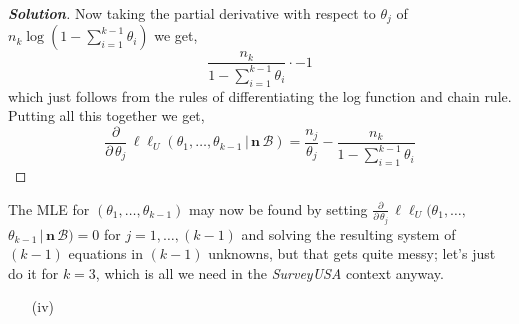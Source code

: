 \documentclass[12pt]{article}
\newcommand{\given}{\, | \,}
\newenvironment{solution}{\begin{tcolorbox}[breakable]\begin{proof}[\textbf{\textit{Solution}}] }{\end{proof}\end{tcolorbox}}
\begin{document}
\begin{itemize}
\begin{itemize}
\begin{itemize}
\begin{solution}
    Now taking the partial derivative with respect to $\theta_j$ of $n_k \log(1 - \sum_{i=1}^{k-1}\theta_i)$ we get,
    \[\dfrac{n_k}{1 - \sum_{i =1 }^{k-1}\theta_i} \cdot -1\] which just follows from the rules of differentiating the log function and chain rule. Putting all this together we get,
    \[\frac{ \partial }{ \partial \, \theta_j } \, \ell \ell_U ( \theta_1, \dots, \theta_{ k - 1 } \given \bm{ n } \, \mathcal{ B } ) = \frac{ n_j }{ \theta_j } - \frac{ n_k }{ 1 - \sum_{ i = 1 }^{ k - 1 } \theta_i }\]
\end{solution}

\vspace*{0.1in}

\end{itemize}

The MLE for $( \theta_1, \dots, \theta_{ k - 1 } )$ may now be found by setting $\frac{ \partial }{ \partial \, \theta_j } \, \ell \ell_U ( \theta_1, \dots,$ $\theta_{ k - 1 } \given \bm{ n } \, \mathcal{ B } ) = 0$ for $j = 1, \dots, ( k - 1 )$ and solving the resulting system of $( k - 1 )$ equations in $( k - 1 )$ unknowns, but that gets quite messy; let's just do it for $k = 3$, which is all we need in the \textit{SurveyUSA} context anyway. 

\begin{itemize}
\item[(iv)]


\end{itemize}
\end{itemize}
\end{itemize}
\end{document}
